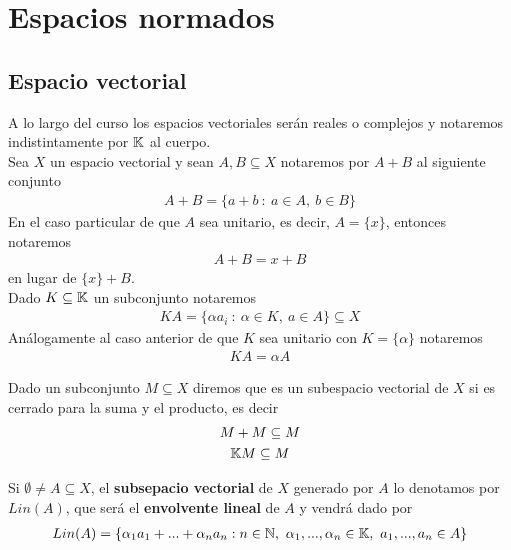 \chapter{Espacios normados}


\section{Espacio vectorial}

\begin{notacion}
    A lo largo del curso los espacios vectoriales serán reales o complejos y notaremos indistintamente por $\mathbb{K}$ al cuerpo.\\

    Sea $X$ un espacio vectorial y sean $A,B\subseteq X$ notaremos por $A+B$ al siguiente conjunto
    \begin{gather*}
        A+B = \{a + b \ : \ a\in A,\ b\in B\}
    \end{gather*}
    En el caso particular de que $A$ sea unitario, es decir, $A=\{x\}$, entonces notaremos 
    \begin{gather*}
        A + B = x + B
    \end{gather*} 
    en lugar de $\{x\} + B$.\\

    Dado $K\subseteq \mathbb{K}$ un subconjunto notaremos
    \begin{gather*}
        KA = \{\alpha a_i \ : \ \alpha \in K,\ a\in A\} \subseteq X
    \end{gather*}
    Análogamente al caso anterior de que $K$ sea unitario con $K=\{\alpha\}$ notaremos 
    \begin{gather*}
        KA = \alpha A
    \end{gather*}
\end{notacion}

\begin{definicion}
    Dado un subconjunto $M\subseteq X$ diremos que es un subespacio vectorial de $X$ si es cerrado para la suma y el producto, es decir
    \begin{gather*}
        M + M \subseteq M\\
        \mathbb{K} M \subseteq M
    \end{gather*}
\end{definicion}

\begin{definicion}
    Si $\emptyset \neq A \subseteq X$, el \textbf{subsepacio vectorial} de $X$ generado por $A$ lo denotamos por $Lin(A)$, que será el \textbf{envolvente lineal} de $A$ y vendrá dado por
    \begin{gather*}
        Lin(A) = \{\alpha_1 a_1 + ... + \alpha_na_n : n\in \bb{N},\ \alpha_1,...,\alpha_n\in \bb{K},\ a_1,...,a_n\in A\}
    \end{gather*}
\end{definicion}

